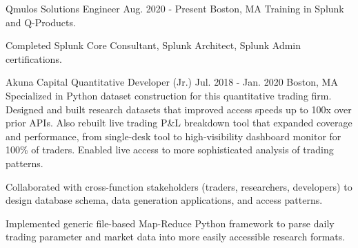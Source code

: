 

\begin{cventries}
  \cventry
  {Qmulos}
  {Solutions Engineer}
  {Aug. 2020 - Present}
  {Boston, MA}
  {Training in Splunk and Q-Products.}
  {\begin{cvitems}
  \item Completed Splunk Core Consultant, Splunk Architect, Splunk Admin certifications.
\end{cvitems}
  }

  \cventry
    {Akuna Capital}
    {Quantitative Developer (Jr.)}
    {Jul. 2018 - Jan. 2020} %
    {Boston, MA} %
    {Specialized in Python dataset construction for this quantitative trading
    firm. Designed and built research datasets that improved access speeds up to
    100x over prior APIs. Also rebuilt live trading P\&L breakdown tool that
    expanded coverage and performance, from single-desk tool to high-visibility
    dashboard monitor for 100\% of traders. Enabled live access to more
    sophisticated analysis of trading patterns.}
    {\begin{cvitems} %
      \item Collaborated with cross-function stakeholders (traders,
            researchers, developers) to design database schema, data
            generation applications, and access patterns.
      \item Implemented generic file-based Map-Reduce Python framework to
            parse daily trading parameter and market data into more easily
            accessible research formats.
    \end{cvitems}}


\end{cventries}
